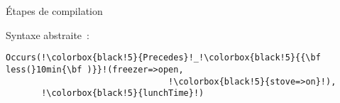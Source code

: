 \begin{frame}[fragile]{Étapes de compilation}
  \begin{minipage}{.45\linewidth}
      \vspace*{-34.28mm}
      \begin{coloredbox}[black]{\tiny Syntaxe abstraite~:}
      \begin{lstlisting}[language=Maloya,basicstyle=\ttfamily\tiny,escapechar=!]
Occurs(!\colorbox{black!5}{Precedes}!_!\colorbox{black!5}{{\bf less(}10min{\bf )}}!(freezer=>open,
                                !\colorbox{black!5}{stove=>on}!),
       !\colorbox{black!5}{lunchTime}!)
     \end{lstlisting}
\end{coloredbox}
   \vfill
 \end{minipage}
 \hfill
 \begin{minipage}{.52\linewidth}
   \begin{tiny}
   \end{tiny}
 \end{minipage}
\end{frame}

